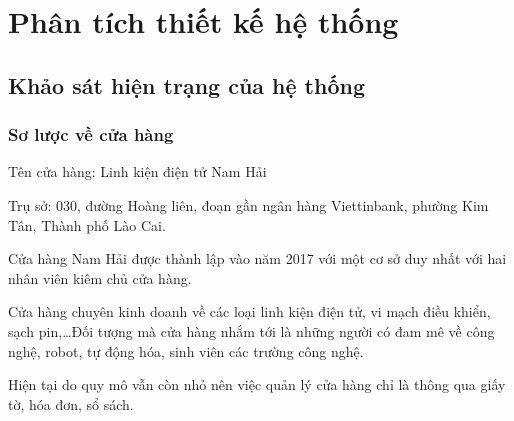 \chapter{Phân tích thiết kế hệ thống}
\section{Khảo sát hiện trạng của hệ thống}
\subsection{Sơ lược về cửa hàng}
Tên cửa hàng: Linh kiện điện tử Nam Hải\par
Trụ sở: 030, đường Hoàng liên, đoạn gần ngân hàng Viettinbank, phường Kim Tân, Thành phố Lào Cai.\par
Cửa hàng Nam Hải được thành lập vào năm 2017 với một cơ sở duy nhất với hai nhân viên kiêm chủ cửa hàng.\par
Cửa hàng chuyên kinh doanh về các loại linh kiện điện tử, vi mạch điều khiển, sạch pin,\dots Đối tượng mà cửa hàng nhắm tới là những người có đam mê về công nghệ, robot, tự động hóa, sinh viên các trường công nghệ.\par
Hiện tại do quy mô vẫn còn nhỏ nên việc quản lý cửa hàng chỉ là thông qua giấy tờ, hóa đơn, sổ sách.
